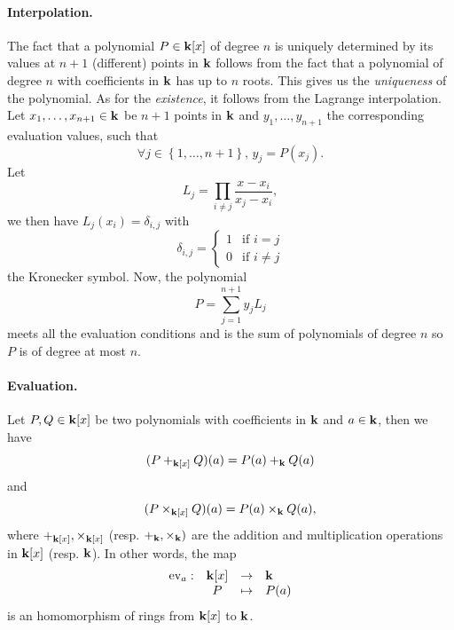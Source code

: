 \paragraph{Interpolation.} The fact that a polynomial $P\in\mathbf{k}[x]$ of degree $n$
is uniquely determined by its values at $n+1$ (different) points in $\mathbf{k}$ follows
from the fact that a polynomial of degree $n$ with coefficients in $\mathbf{k}$ has up
to $n$ roots. This gives us the \emph{uniqueness} of the polynomial. As for the
\emph{existence}, it follows from the Lagrange interpolation. Let $x_1, \dots,
x_{n+1}\in\mathbf{k}$ be $n+1$ points in $\mathbf{k}$ and $y_1, \dots, y_{n+1}$ the
corresponding evaluation values, such that
\[
  \forall j\in\left\{ 1, \dots, n+1 \right\},\,y_j = P(x_j).
\]
Let 
\[
  L_j = \prod_{i\neq j}\frac{x-x_i}{x_j-x_i},
\]
we then have $L_j(x_i) = \delta_{i, j}$ with
\[
  \delta_{i, j} = 
  \left\{\begin{array}{ll}
      1&\mbox{if } i=j\\
      0&\mbox{if } i\neq j
    \end{array}
    \right.
\]
the Kronecker symbol. Now, the polynomial
\[
  P = \sum_{j=1}^{n+1} y_j L_j
\]
meets all the evaluation conditions and is the sum of polynomials of degree $n$
so $P$ is of degree at most $n$.

\paragraph{Evaluation.} Let $P, Q\in\mathbf{k}[x]$ be two polynomials with coefficients
in $\mathbf{k}$ and $a\in\mathbf{k}$, then we have
\[
  (P+_{\mathbf{k}[x]}Q)(a) = P(a) +_{\mathbf{k}} Q(a)
\]
and 
\[
  (P\times_{\mathbf{k}[x]} Q)(a) = P(a) \times_{\mathbf{k}} Q(a),
\]
where $+_{\mathbf{k}[x]}, \times_{\mathbf{k}[x]}$ (resp. $+_{\mathbf{k}}, \times_{\mathbf{k}})$ are the addition
and multiplication operations in $\mathbf{k}[x]$ (resp. $\mathbf{k}$).
In other words, the map
\[
\begin{array}{lccl}
  \textrm{ev}_a:&\mathbf{k}[x]&\to&\mathbf{k}\\
  &P&\mapsto&P(a)
\end{array}
\]
is an homomorphism of rings from $\mathbf{k}[x]$ to $\mathbf{k}$.

